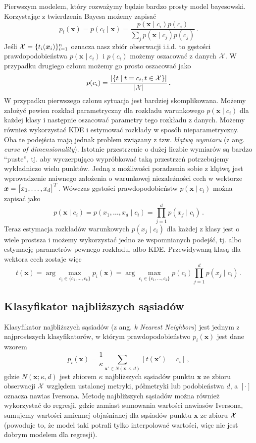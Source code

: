 \documentclass{myclass}
\numberwithin{equation}{subsection}
\begin{document}
Pierwszym modelem, który rozważymy będzie bardzo prosty model bayesowski. Korzystając z twierdzenia
Bayesa możemy zapisać
\[
p_i(\bm{x}) = p(c_i \mid \bm{x}) = \frac{ p(\bm{x} \mid c_i) p(c_i) }{ \sum_j p(\bm{x} \mid c_j) p(c_j) }\,.
\]
Jeśli \(\mathcal{X} = \{t_i(\bm{x}_i)\}_{i=1}^n\) oznacza nasz zbiór obserwacji i.i.d. to gęstości
prawdopodobieństwa \(p(\bm{x} \mid c_i)\) i \(p(c_i)\) możemy oszacować z danych \(\mathcal{X}\). W
przypadku drugiego członu możemy go prosto oszacować jako
\[
p(c_i) = \frac{\left|\{t \mid t = c_i, t \in \mathcal{X}\}\right|}{|\mathcal{X}|}\,.
\]
W przypadku pierwszego członu sytuacja jest bardziej skomplikowana. Możemy założyć pewien rozkład
parametryczny dla rozkładu warunkowego \(p(\bm{x} \mid c_i)\) dla każdej klasy i następnie oszacować
parametry tego rozkładu z danych. Możemy również wykorzystać KDE i estymować rozkłady w sposób
nieparametryczny. Oba te podejścia mają jednak problem związany z tzw. \emph{klątwą wymiaru} (z ang.
\textit{curse of dimensionality}). Istotnie przestrzenie o dużej liczbie wymiarów są bardzo
\enquote{puste}, tj. aby wyczerpująco wypróbkować taką przestrzeń potrzebujemy wykładniczo wielu
punktów. Jedną z możliwości poradzenia sobie z klątwą jest wprowadzenie naiwnego założenia o
warunkowej niezależności cech w wektorze \(\bm{x} = \mqty[x_1, \ldots, x_d]^T\). Wówczas gęstości
prawdopodobieństw \(p(\bm{x} \mid c_i)\) można zapisać jako
\[
p(\bm{x} \mid c_i) = p(x_1, \ldots, x_d \mid c_i) = \prod_{j=1}^d p(x_j \mid c_i)\,.
\]
Teraz estymacja rozkładów warunkowych \(p(x_j \mid c_i)\) dla każdej z klasy jest o wiele prostsza i
możemy wykorzystać jedno ze wspomnianych podejść, tj. albo estymację parametrów pewnego rozkładu,
albo KDE. Przewidywaną klasą dla wektora cech zostaje więc
\[
t(\bm{x}) = \arg\max_{c_i \in \{c_1,\ldots,c_k\} } p_i(\bm{x}) = \arg\max_{c_i \in \{c_1,\ldots,c_k\} } p(c_i) \prod_{j=1}^d p(x_j \mid c_i)\,.
\]


\subsection{Klasyfikator najbliższych sąsiadów}

Klasyfikator najbliższych sąsiadów (z ang. \textit{k Nearest Neighbors}) jest jednym z najprostszych
klasyfikatorów, w którym prawdopodobieństwo \(p_i(\bm{x})\) jest dane wzorem
\[
p_i(\bm{x}) = \frac{1}{\kappa} \sum_{\bm{x}' \in N(\bm{x}; \kappa, d)} [t(\bm{x}') = c_i]\,,
\]
gdzie \(N(\bm{x}; \kappa, d)\) jest zbiorem \(\kappa\) najbliższych sąsiadów punktu \(\bm{x}\) ze
zbioru obserwacji \(\mathcal{X}\) względem ustalonej metryki, półmetryki lub podobieństwa \(d\), a
\([\cdot]\) oznacza nawias Iversona. Metodę najbliższych sąsiadów można również wykorzystać do
regresji, gdzie zamiast sumowania wartości nawiasów Iversona, sumujemy wartości zmiennej objaśnianej
dla sąsiadów punktu \(\bm{x}\) ze zbioru \(\mathcal{X}\) (powoduje to, że model taki potrafi tylko
interpolować wartości, więc nie jest dobrym modelem dla regresji).
\end{document}
